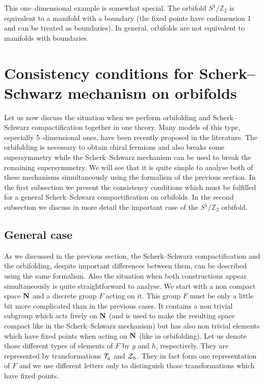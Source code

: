 \documentclass[a4paper,12pt]{article}
\def\cT{{\cal T}}
\def\cZ{{\cal Z}}
\def\bN{{\bf N}}
\def\ZZ{\mathbb Z}
\begin{document}
This one--dimensional example is somewhat special. The orbifold
$S^1/\ZZ_2$ is equivalent to a manifold with a boundary (the fixed
points have codimension 1 and can be treated as boundaries).
In general, orbifolds are not equivalent to manifolds with
boundaries. 




\section{Consistency conditions for Scherk--Schwarz mechanism on
orbifolds} 


Let us now discuss the situation when we perform orbifolding and 
Scherk--Schwarz compactification together in one theory. 
Many models of this type, especially 5--dimensional ones, have been
recently proposed in the literature. The orbifolding is necessary to
obtain chiral fermions and also breaks some supersymmetry while the
Scherk--Schwarz mechanism can be used to break the remaining
supersymmetry. We will see that it is quite simple to analyse 
both of these mechanisms simultaneously using the formalism of the
previous section. In the first subsection we present the
consistency conditions which must be fulfilled for a general
Scherk--Schwarz compactification on orbifolds. In the second
subsection we discuss in more detail the important case of the
$S^1/\ZZ_2$ orbifold.


\subsection{General case}
\label{generalcase}

As we discussed in the previous section, the Scherk--Schwarz
compactification and the orbifolding, despite important 
differences between them, can be described using the same
formalism. Also the situation when both constructions appear
simultaneously is quite straightforward to analyse. We start with a
non compact space $\bN$ and a discrete  
group $F$ acting on it. This group $F$ must be only a little bit more
complicated than in the previous cases. It contains a non trivial
subgroup which acts freely on $\bN$ (and is used to make the resulting
space compact like in the Scherk--Schwarz mechanism) but has also
non trivial elements which have fixed points when acting on $\bN$
(like in orbifolding). Let us denote those different types of elements
of $F$ by $g$ and $h$, respectively. They are represented by
transformations $\cT_g$ and $\cZ_h$. They in fact form one
representation of $F$ and we use different letters only to distinguish
those transformations which have fixed points.
\end{document}
